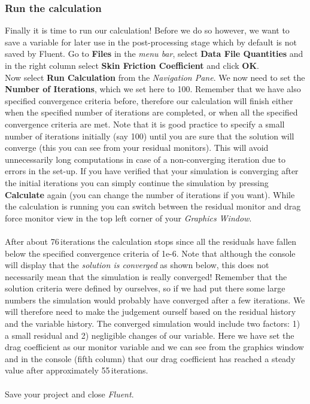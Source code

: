 \documentclass[11pt,a4paper,oneside]{scrartcl}
\newcommand\bfr[1]{\textcolor[rgb]{1,0.00,0.00}{\textbf{\textsf{#1}}}}
\begin{document}
\subsubsection{Run the calculation}

Finally it is time to run our calculation! Before we do so however, we want to save a variable for later use in the post-processing stage which  by default is not saved by Fluent. Go to \bfr{Files} in the \emph{menu bar}, select \bfr{Data File Quantities} and in the right column select \bfr{Skin Friction Coefficient} and click \bfr{OK}.
\\
Now select \bfr{Run Calculation} from the \emph{ Navigation Pane}. We now need to set the \bfr{Number of Iterations}, which we set here to 100. Remember that we have also specified convergence criteria before, therefore our calculation will finish either when the specified number of iterations are completed, or when all the specified convergence criteria are met. Note that it is good practice to specify a small number of iterations initially (say 100) until you are sure that the solution will converge (this you can see from your residual monitors). This will avoid unnecessarily long computations in case of a non-converging iteration due to errors in the set-up. If you have verified that your simulation is converging after the initial iterations you can simply continue the simulation by pressing \bfr{Calculate} again (you can change the number of iterations if you want). While the calculation is running you can switch between the residual monitor and drag force monitor view in the top left corner of your \emph{Graphics Window}.
\\
\\
After about 76\,iterations the calculation stops since all the residuals have fallen below the specified convergence criteria of 1e-6. Note that although the console will display that the \emph{solution is converged} as shown below, this does not necessarily mean that the simulation is really converged! Remember that the solution criteria were defined by ourselves, so if we had put there some large numbers the simulation would probably have converged after a few iterations. We will therefore need to make the judgement ourself based on the residual history and the variable history. The converged simulation would include two factors: 1) a small residual and 2) negligible changes of our variable. Here we have set the drag coefficient as our monitor variable and we can see from the graphics window and in the console (fifth column) that our drag coefficient has reached a steady value after approximately 55\,iterations.
\\
\\
Save your project and close \emph{Fluent}.
\end{document}

